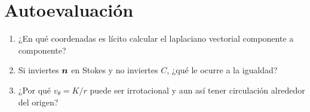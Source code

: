 \section{Autoevaluación}
\begin{enumerate}[leftmargin=1.4em]
\item ¿En qué coordenadas es lícito calcular el laplaciano vectorial componente a componente?
\item Si inviertes \(\boldsymbol{n}\) en Stokes y no inviertes \(C\), ¿qué le ocurre a la igualdad?
\item ¿Por qué \(v_\theta=K/r\) puede ser irrotacional y aun así tener circulación alrededor del origen?
\end{enumerate}
